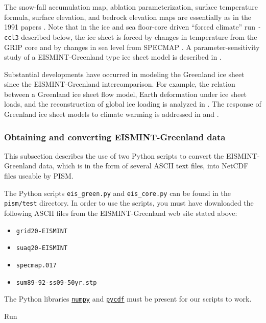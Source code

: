 \documentclass[11pt,final]{amsart}
\begin{document}
\centerline{}
\medskip

\noindent The snow-fall accumulation map, ablation parameterization, surface temperature formula, surface elevation, and bedrock elevation maps are essentially as in the 1991 papers \cite{Letreguillyetal1991,OhmuraReeh}.  Note that in the ice and sea floor-core driven ``forced climate'' run \verb|-ccl3| described below, the ice sheet is forced by changes in temperature from the GRIP core \cite{Dansgaardetal1993} and by changes in sea level from SPECMAP \cite{Imbrieetal1984}.  A parameter-sensitivity study of a EISMINT-Greenland type ice sheet model is described in \cite{RitzFabreLetreguilly}.

Substantial developments have occurred in modeling the Greenland ice sheet since the EISMINT-Greenland intercomparison.  For example, the relation between a Greenland ice sheet flow model, Earth deformation under ice sheet loads, and the reconstruction of global ice loading is analyzed in \cite{TarasovPeltier}.  The response of Greenland ice sheet models to climate warming is addressed in \cite{HuybrechtsdeWolde} and \cite{Greve00}.


\subsubsection*{Obtaining and converting EISMINT-Greenland data}  This subsection describes the use of two Python scripts to convert the EISMINT-Greenland data, which is in the form of several ASCII text files, into NetCDF files useable by PISM.

The Python scripts \verb|eis_green.py| and \verb|eis_core.py| can be found in the \verb|pism/test| directory.  In order to use the scripts, you must have downloaded the following ASCII files from the EISMINT-Greenland web site stated above:\begin{itemize}
 \item \verb|grid20-EISMINT|
 \item \verb|suaq20-EISMINT|
 \item \verb|specmap.017|
 \item \verb|sum89-92-ss09-50yr.stp|
\end{itemize}
The Python libraries \href{http://numpy.scipy.org/}{\texttt{numpy}} and \href{http://pysclint.sourceforge.net/pycdf/}{\texttt{pycdf}} must be present for our scripts to work.

Run
\end{document}

